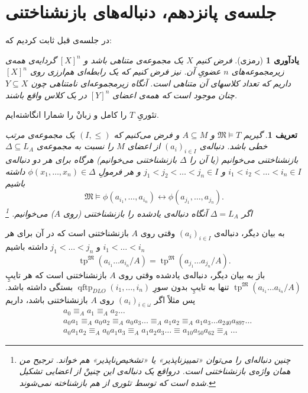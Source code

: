 \documentclass[12pt,a4paper]{report}
\theoremstyle{colorhead}
\newtheorem{defn}[thm]{تعریف}
\newtheorem{yad}[thm]{یادآوری}
\DeclareMathOperator{\qftp}{qftp}
\DeclareMathOperator{\tp}{tp}
\begin{document}
\section{جلسه‌ی پانزدهم،‌ دنباله‌های بازنشناختنی}
در جلسه‌ی قبل ثابت کردیم که:
\begin{yad}[رمزی]
فرض کنیم 
$X$
یک مجموعه‌ی متناهی باشد و 
$[X]^n$
گردایه‌ی همه‌ی زیرمجموعه‌های
$n$
عضویِ آن. نیز فرض کنیم که  یک
رابطه‌ای هم‌ارزی روی
$[X]^n$
داریم که تعداد کلاسهای آن
متناهی
است. آنگاه زیرمجموعه‌ای نامتناهی چون
$Y\subseteq X$
چنان موجود است که همه‌ی اعضای
$[Y]^n$
در یک کلاس واقع باشند.
\end{yad}
تئوریِ
$T$
را کامل و زبانْ را شمارا انگاشته‌ایم. 
\begin{defn}
گیریم
$\mathfrak{M}\models T$
و
$A\subseteq M$
و فرض می‌کنیم که
$(I,\leq)$
یک مجموعه‌ی مرتب خطی باشد. دنباله‌ی
$(a_i)_{i\in I}$
از اعضای
$M$
را
نسبت به
مجموعه‌ی
$\Delta\subseteq L_A$
بازنشناختنی 
می‌خوانیم 
(یا آن را 
$\Delta$
بازنشناختنی می‌خوانیم)
هرگاه
برای هر دو دنباله‌ی
$i_1<i_2<\ldots<i_n\in I$
و
$j_1<j_2<\ldots<j_n\in I$
و هر فرمولِ
$\phi(x_1,\ldots,x_n)\in \Delta$
داشته باشیم
\[
\mathfrak{M}\models \phi(a_{i_1},\ldots,a_{i_n})\leftrightarrow \phi(a_{j_1},\ldots,a_{j_n}).
\]
اگر
$\Delta=L_A$
آنگاه دنباله‌ی یادشده را بازنشناختنی 
(روی
$A$)
می‌خوانیم. 
\footnote{ 
چنین دنباله‌ای را می‌توان «تمییزناپذیر» یا «تشخیص‌ناپذیر» هم خواند. ترجیح من همان واژه‌ی 
بازنشناختنی است. درواقع  یک دنباله‌ی این چنینْ
از اعضایی تشکیل شده است که توسط تئوری از هم بازشناخته نمی‌شوند. 

}
\end{defn}
به بیان دیگر، دنباله‌ی
$(a_i)_{i\in I}$
وقتی 
روی
$A$
بازنشناختنی است که در آن برای هر
$i_1<\ldots<i_n$
و
$j_1<\ldots<j_n$
داشته باشیم
\[
\tp^\mathfrak{M}(a_{i_1}\ldots a_{i_n}/A)=\tp^\mathfrak{M}(a_{j_1}\ldots a_{j_n}/A).
\]
باز به بیان دیگر، دنباله‌ی یادشده وقتی
روی
$A$
 بازنشناختنی است که هر تایپِ
$\tp^\mathfrak{M}(a_{i_1}\ldots a_{i_n}/A)$
تنها به تایپِ بدون سورِ
$\qftp_{DLO}(i_1,\ldots,i_n)$
بستگی داشته باشد. پس مثلاً اگر
$(a_i)_{i\in \omega}$
روی
$A$
بازنشناختنی باشد، داریم
\begin{align*}
& a_0 \equiv_A a_1 \equiv_A  a_2 \ldots \\
& a_0 a_1 \equiv_A a_0 a_2 \equiv_A a_0 a_3 \ldots \equiv_A a_1 a_2 \equiv_A a_1 a_3\ldots a_{240}a_{897}\ldots \\
& a_0 a_1 a_2 \equiv_A a_0 a_1 a_3\equiv_A a_1 a_2 a_3\ldots \equiv a_{10}a_{50}a_{62}\equiv_A \ldots
\end{align*}
\end{document}
